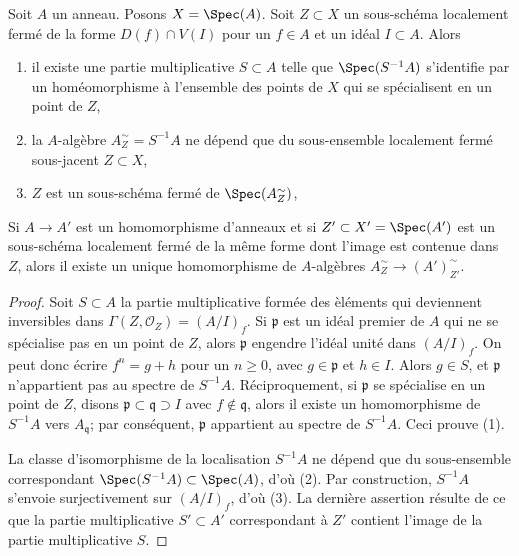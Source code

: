 \begin{lemma}
\label{lemma-localization}
Soit $A$ un anneau. Posons $X = \Spec(A)$. Soit $Z \subset X$ un sous-sch\'ema localement
ferm\'e de la forme $D(f) \cap V(I)$ pour un $f \in A$ et un
id\'eal $I \subset A$. Alors
\begin{enumerate}
\item il existe une partie multiplicative $S \subset A$ telle que
$\Spec(S^{-1}A)$ s'identifie par un hom\'eomorphisme \`a l'ensemble des points de $X$
qui se sp\'ecialisent en un point de $Z$,
\item la $A$-alg\`ebre $A_Z^\sim = S^{-1}A$ ne d\'epend que du
sous-ensemble localement ferm\'e sous-jacent $Z \subset X$,
\item $Z$ est un sous-sch\'ema ferm\'e de $\Spec(A_Z^\sim)$,
\end{enumerate}
Si $A \to A'$ est un homomorphisme d'anneaux et si $Z' \subset X' = \Spec(A')$ est un
sous-sch\'ema localement ferm\'e de la m\^eme forme dont l'image est contenue dans $Z$,
alors il existe un unique homomorphisme de $A$-alg\`ebres
$A_Z^\sim \to (A')_{Z'}^\sim$.
\end{lemma}

\begin{proof}
Soit $S \subset A$ la partie multiplicative form\'ee des \`el\'ements qui deviennent
inversibles dans $\Gamma(Z, \mathcal{O}_Z) = (A/I)_f$.
Si $\mathfrak p$ est un id\'eal premier de $A$ qui ne se sp\'ecialise pas en un point de $Z$,
alors $\mathfrak p$ engendre l'id\'eal unit\'e dans $(A/I)_f$. On peut donc
\'ecrire $f^n =  g + h$ pour un $n \geq 0$, avec $g \in \mathfrak p$ et
$h \in I$. Alors $g \in S$, et $\mathfrak p$ n'appartient pas
au spectre de $S^{-1}A$. R\'eciproquement, si $\mathfrak p$ se sp\'ecialise
en un point de $Z$, disons $\mathfrak p \subset \mathfrak q \supset I$ avec
$f \not \in \mathfrak q$, alors il existe un homomorphisme de $S^{-1}A$ vers
$A_\mathfrak q$; par cons\'equent, $\mathfrak p$ appartient au spectre de $S^{-1}A$.
Ceci prouve (1).

\medskip\noindent
La classe d'isomorphisme de la localisation $S^{-1}A$ ne d\'epend que
du sous-ensemble correspondant $\Spec(S^{-1}A) \subset \Spec(A)$, d'o\`u
(2). Par construction, $S^{-1}A$ s'envoie surjectivement sur
$(A/I)_f$, d'o\`u (3). La derni\`ere assertion r\'esulte de ce que la partie multiplicative
$S' \subset A'$ correspondant \`a $Z'$ contient l'image de la
partie multiplicative $S$.
\end{proof}


